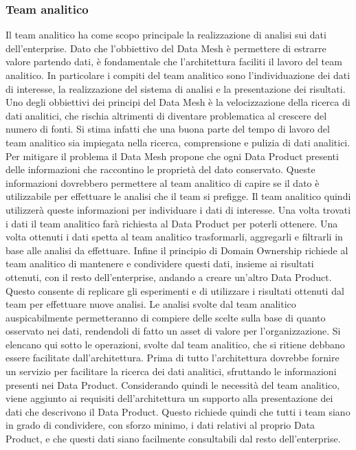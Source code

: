 \documentclass[a4paper,12pt]{report}
\begin{document}
\subsubsection{Team analitico}
Il team analitico ha come scopo principale la realizzazione di analisi sui dati dell'enterprise.
Dato che l'obbiettivo del Data Mesh è permettere di estrarre valore partendo dati, è fondamentale che l'architettura faciliti il lavoro del team analitico.
In particolare i compiti del team analitico sono l'individuazione dei dati di interesse, la realizzazione del sistema di analisi e la presentazione dei risultati. 
Uno degli obbiettivi dei principi del Data Mesh è la velocizzazione della ricerca di dati analitici, che rischia altrimenti di  diventare problematica al crescere del numero di fonti. 
Si stima infatti che una buona parte del tempo di lavoro del team analitico sia impiegata nella ricerca, comprensione e pulizia di dati analitici.
Per mitigare il problema il Data Mesh propone che ogni Data Product presenti delle informazioni che raccontino le proprietà del dato conservato.
Queste informazioni dovrebbero permettere al team analitico di capire se il dato è utilizzabile per effettuare le analisi che il team si prefigge. 
Il team analitico quindi utilizzerà queste informazioni per individuare i dati di interesse. 
Una volta trovati i dati il team analitico farà richiesta al Data Product per poterli ottenere.
Una volta ottenuti i dati spetta al team analitico trasformarli, aggregarli e filtrarli in base alle analisi da effettuare.
Infine il principio di Domain Ownership richiede al team analitico di mantenere e condividere questi dati, insieme ai risultati ottenuti, con il resto dell'enterprise, andando a creare un'altro Data Product.
Questo consente di replicare gli esperimenti e di utilizzare i risultati ottenuti dal team per effettuare nuove analisi.
Le analisi svolte dal team analitico auspicabilmente permetteranno di compiere delle scelte sulla base di quanto osservato nei dati, rendendoli di fatto un asset di valore per l'organizzazione.
Si elencano qui sotto le operazioni, svolte dal team analitico, che si ritiene debbano essere facilitate dall'architettura.
Prima di tutto l'architettura dovrebbe fornire un servizio per facilitare la ricerca dei dati analitici, sfruttando le informazioni presenti nei Data Product.
Considerando quindi le necessità del team analitico, viene aggiunto ai requisiti dell'architettura un supporto alla presentazione dei dati che descrivono il Data Product. 
Questo richiede quindi che tutti i team siano in grado di condividere, con sforzo minimo, i dati relativi al proprio Data Product, e che questi dati siano facilmente consultabili dal resto dell'enterprise.
\end{document}
